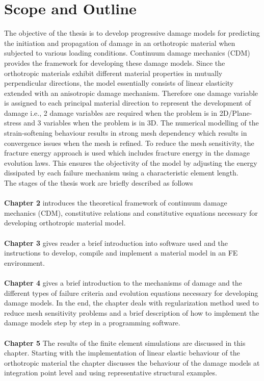 \documentclass[12pt]{report}
\begin{document}
\section{Scope and Outline}
\indent\indent\indent  The objective of the thesis is to develop progressive damage models for predicting the initiation and propagation of damage in an orthotropic material when subjected to various loading conditions. Continuum damage mechanics (CDM) provides the framework for developing these damage models. Since the orthotropic materials exhibit different material properties in mutually perpendicular directions, the model essentially consists of linear elasticity extended with an anisotropic damage mechanism. Therefore one damage variable is assigned to each principal material direction to represent the development of damage i.e., 2 damage variables are required when the problem is in 2D/Plane-stress  and 3 variables when the problem is in 3D. The numerical modelling of the strain-softening behaviour results in strong mesh dependency which results in convergence issues when the mesh is refined. To reduce the mesh sensitivity, the fracture energy approach is used which includes fracture energy in the damage evolution laws. This ensures the objectivity of the model by adjusting the energy dissipated by each failure mechanism using a characteristic element length.\\
The stages of the thesis work are briefly described as follows\\\\
\textbf{Chapter 2} introduces the theoretical framework of continuum damage mechanics (CDM), constitutive relations and constitutive equations necessary for developing orthotropic material model. \\\\
\textbf{Chapter 3} gives reader a brief introduction into software used and the instructions to develop, compile and implement a material model in an FE environment. \\\\
\textbf{Chapter 4} gives a brief introduction to the mechanisms of damage and the different types of failure criteria and evolution equations necessary for developing damage models. In the end, the chapter deals with regularization method used to reduce mesh sensitivity problems and a brief description of how to implement the damage models step by step in a programming software. \\\\
\textbf{Chapter 5} The results of the finite element simulations are discussed in this chapter. Starting with the implementation of linear elastic behaviour of the orthotropic material the chapter discusses the behaviour of the damage models at integration point level and using representative structural examples.  
\end{document}
